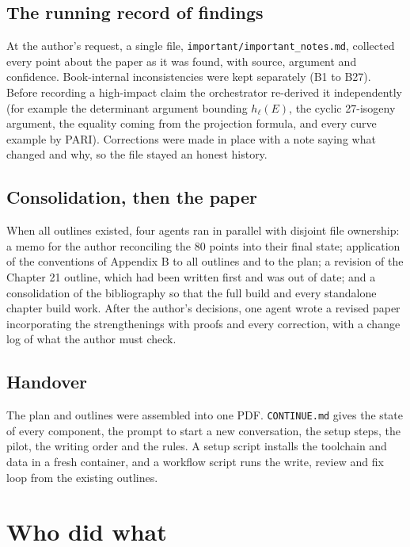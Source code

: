 \documentclass[11pt]{article}
\begin{document}
\subsection{The running record of findings}
At the author's request, a single file, \texttt{important/important\_notes.md}, collected every point about the
paper as it was found, with source, argument and confidence. Book-internal inconsistencies were kept separately
(B1 to B27). Before recording a high-impact claim the orchestrator re-derived it independently (for example the
determinant argument bounding $h_\ell(E)$, the cyclic 27-isogeny argument, the equality coming from the projection
formula, and every curve example by PARI). Corrections were made in place with a note saying what changed and
why, so the file stayed an honest history.

\subsection{Consolidation, then the paper}
When all outlines existed, four agents ran in parallel with disjoint file ownership: a memo for the author
reconciling the 80 points into their final state; application of the conventions of Appendix B to all outlines
and to the plan; a revision of the Chapter 21 outline, which had been written first and was out of date; and a
consolidation of the bibliography so that the full build and every standalone chapter build work. After the
author's decisions, one agent wrote a revised paper incorporating the strengthenings with proofs and every
correction, with a change log of what the author must check.

\subsection{Handover}
The plan and outlines were assembled into one PDF. \texttt{CONTINUE.md} gives the state of every component, the
prompt to start a new conversation, the setup steps, the pilot, the writing order and the rules. A setup script
installs the toolchain and data in a fresh container, and a workflow script runs the write, review and fix loop
from the existing outlines.

\section{Who did what}
\end{document}

